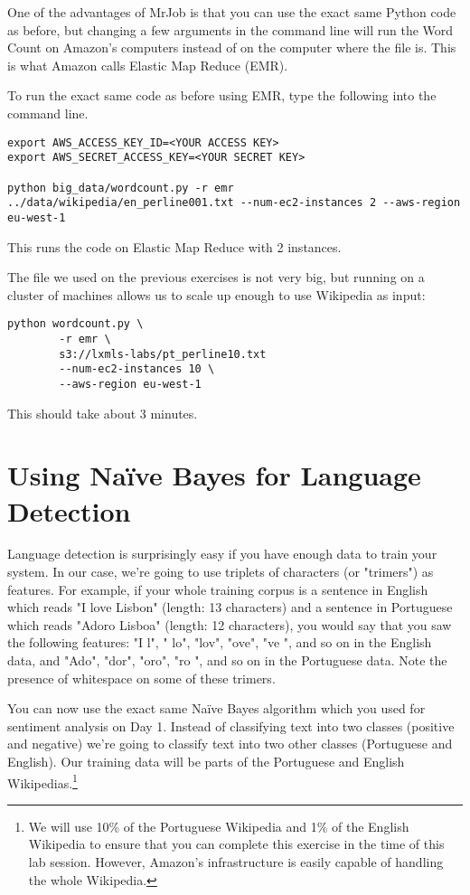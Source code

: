 One of the advantages of MrJob is that you can use the exact same Python code as before, but changing a few arguments in the command line will run the Word Count on Amazon's computers instead of on the computer where the file is. This is what Amazon calls Elastic Map Reduce (EMR).

To run the exact same code as before using EMR, type the following into the command line.

\begin{verbatim}
export AWS_ACCESS_KEY_ID=<YOUR ACCESS KEY>
export AWS_SECRET_ACCESS_KEY=<YOUR SECRET KEY>

python big_data/wordcount.py -r emr ../data/wikipedia/en_perline001.txt --num-ec2-instances 2 --aws-region eu-west-1
\end{verbatim}

This runs the code on Elastic Map Reduce with 2 instances.

The file we used on the previous exercises is not very big, but running on a cluster of machines allows us to
scale up enough to use Wikipedia as input:

\begin{verbatim}
python wordcount.py \
        -r emr \
        s3://lxmls-labs/pt_perline10.txt
        --num-ec2-instances 10 \
        --aws-region eu-west-1
\end{verbatim}

This should take about 3 minutes.

\section{Using Na\"{i}ve Bayes for Language Detection}

Language detection is surprisingly easy if you have enough data to train your system. In our case, we're going to use triplets of characters (or "trimers") as features. For example, if your whole training corpus is a sentence in English which reads "I love Lisbon" (length: 13 characters) and a sentence in Portuguese which reads "Adoro Lisboa" (length: 12 characters), you would say that you saw the following features: "I l", " lo", "lov", "ove", "ve ", and so on in the English data, and "Ado", "dor", "oro", "ro ", and so on in the Portuguese data. Note the presence of whitespace on some of these trimers.

You can now use the exact same Na\"{i}ve Bayes algorithm which you used for sentiment analysis on Day 1. Instead of classifying text into two classes (positive and negative) we're going to classify text into two other classes (Portuguese and English). Our training data will be parts of the Portuguese and English Wikipedias.\footnote{We will use 10\% of the Portuguese Wikipedia and 1\% of the English Wikipedia to ensure that you can complete this exercise in the time of this lab session. However, Amazon's infrastructure is easily capable of handling the whole Wikipedia.}

